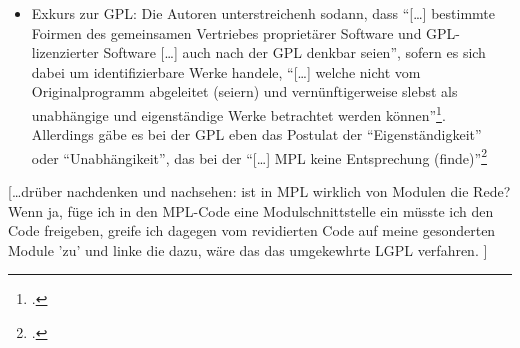 \documentclass[DIV=calc,BCOR=5mm,11pt,headings=small,oneside,abstract=true, toc=bib]{scrartcl}
\begin{document}
\begin{itemize}
 \enquote{[\ldots] dass die neu hinzugefügten Module in eigenständigen
 Dateien vorliegen, die selbst keine Bestandteile des Originalcodes
 enthalten}\footcite[vgl.][354]{ArlBriVol2004a}
 \item Exkurs zur GPL: Die Autoren unterstreichenh sodann, dass \enquote{[\ldots]
 bestimmte Foirmen des gemeinsamen Vertriebes proprietärer Software und
 GPL-lizenzierter Software [\ldots] auch nach der GPL denkbar seien},
 sofern es sich dabei um identifizierbare Werke handele, \enquote{[\ldots]
 welche nicht vom Originalprogramm abgeleitet (seiern) und
 vernünftigerweise slebst als unabhängige und eigenständige Werke
 betrachtet werden können}\footcite[vgl.][354]{ArlBriVol2004a}. Allerdings
 gäbe es bei der GPL eben das Postulat der \enquote{Eigenständigkeit} oder
 \enquote{Unabhängikeit}, das bei der \enquote{[\ldots] MPL keine
 Entsprechung (finde)}\footcite[vgl.][355]{ArlBriVol2004a}
\end{itemize}



[\ldots drüber nachdenken und nachsehen: ist in MPL wirklich von Modulen die
Rede? Wenn ja, füge ich in den MPL-Code eine Modulschnittstelle ein müsste ich
den Code freigeben, greife ich dagegen vom revidierten Code auf meine
gesonderten Module 'zu' und linke die dazu, wäre das das umgekewhrte LGPL
verfahren. ]

\small

\end{document}
